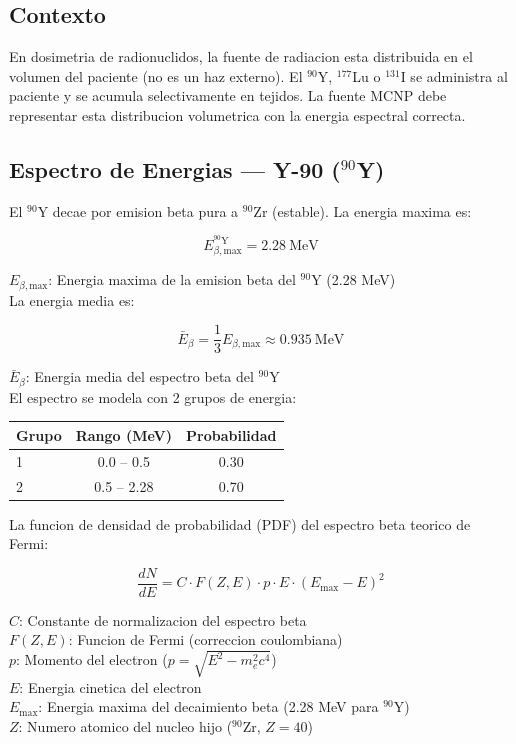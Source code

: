 \documentclass[12pt,a4paper]{article}
\newcommand{\vardef}[2]{\noindent\textbf{#1}: #2\\}
\begin{document}
\subsection{Contexto}

En dosimetria de radionuclidos, la fuente de radiacion esta distribuida en el volumen del paciente (no es un haz externo). El $^{90}$Y, $^{177}$Lu o $^{131}$I se administra al paciente y se acumula selectivamente en tejidos. La fuente MCNP debe representar esta distribucion volumetrica con la energia espectral correcta.

\subsection{Espectro de Energias --- Y-90 ($^{90}$Y)}

El $^{90}$Y decae por emision beta pura a $^{90}$Zr (estable). La energia maxima es:

$$
E_{\beta,\text{max}}^{^{90}\text{Y}} = 2.28\ \text{MeV}
$$

\vardef{$E_{\beta,\text{max}}$}{Energia maxima de la emision beta del $^{90}$Y (2.28 MeV)}

La energia media es:

$$
\bar{E}_\beta = \frac{1}{3} E_{\beta,\text{max}} \approx 0.935\ \text{MeV}
$$

\vardef{$\bar{E}_\beta$}{Energia media del espectro beta del $^{90}$Y}

El espectro se modela con 2 grupos de energia:

\begin{center}
\begin{tabular}{lcc}
\toprule
\textbf{Grupo} & \textbf{Rango (MeV)} & \textbf{Probabilidad} \\
\midrule
1 & 0.0 -- 0.5 & 0.30 \\
2 & 0.5 -- 2.28 & 0.70 \\
\bottomrule
\end{tabular}
\end{center}

La funcion de densidad de probabilidad (PDF) del espectro beta teorico de Fermi:

$$
\frac{dN}{dE} = C \cdot F(Z, E) \cdot p \cdot E \cdot (E_{\max} - E)^2
$$

\vardef{$C$}{Constante de normalizacion del espectro beta}
\vardef{$F(Z, E)$}{Funcion de Fermi (correccion coulombiana)}
\vardef{$p$}{Momento del electron ($p = \sqrt{E^2 - m_e^2 c^4}$)}
\vardef{$E$}{Energia cinetica del electron}
\vardef{$E_{\max}$}{Energia maxima del decaimiento beta (2.28 MeV para $^{90}$Y)}
\vardef{$Z$}{Numero atomico del nucleo hijo ($^{90}$Zr, $Z=40$)}
\end{document}
